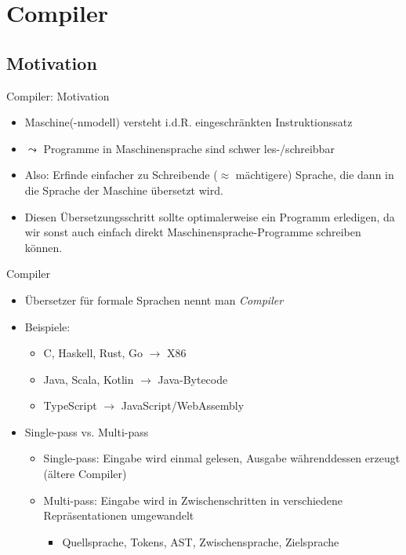 \documentclass{beamer}
\begin{document}
\section{Compiler}

\subsection{Motivation}

\begin{frame}{Compiler: Motivation}
	\begin{itemize}
		\item Maschine(-nmodell) versteht i.d.R. eingeschränkten Instruktionssatz
		\item $\leadsto$ Programme in Maschinensprache sind schwer les-/schreibbar
		\pause
		\item Also: Erfinde einfacher zu Schreibende ($\approx$ mächtigere) Sprache, die dann in die Sprache der Maschine übersetzt wird.
		\item Diesen Übersetzungsschritt sollte optimalerweise ein Programm erledigen, da wir sonst auch einfach direkt Maschinensprache-Programme schreiben können.
	\end{itemize}
\end{frame}

\begin{frame}{Compiler}
	\begin{itemize}
		\item Übersetzer für formale Sprachen nennt man \emph{Compiler}
		\item Beispiele:
		\begin{itemize}
			\item C, Haskell, Rust, Go $\to$ X86
			\item Java, Scala, Kotlin $\to$ Java-Bytecode
			\item TypeScript $\to$ JavaScript/WebAssembly
		\end{itemize}
		\pause
		\item Single-pass vs. Multi-pass
		\begin{itemize}
			\item Single-pass: Eingabe wird einmal gelesen, Ausgabe währenddessen erzeugt (ältere Compiler)
			\item Multi-pass: Eingabe wird in Zwischenschritten in verschiedene Repräsentationen umgewandelt
			\begin{itemize}
				\item Quellsprache, Tokens, AST, Zwischensprache, Zielsprache
			\end{itemize}
		\end{itemize}
	\end{itemize}
\end{frame}
\end{document}
